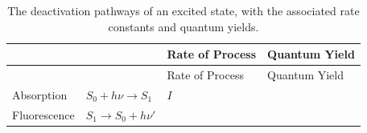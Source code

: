 \documentclass[
]{book}
\begin{document}
\begin{longtable}[]{@{}llll@{}}
\caption{\label{tab:QYtab} The deactivation pathways of an excited state, with the associated rate constants and quantum yields.}\tabularnewline
\toprule
\begin{minipage}[b]{0.33\columnwidth}\raggedright
\strut
\end{minipage} & \begin{minipage}[b]{0.24\columnwidth}\raggedright
\strut
\end{minipage} & \begin{minipage}[b]{0.16\columnwidth}\raggedright
Rate of Process\strut
\end{minipage} & \begin{minipage}[b]{0.16\columnwidth}\raggedright
Quantum Yield\strut
\end{minipage}\tabularnewline
\midrule
\endfirsthead
\toprule
\begin{minipage}[b]{0.33\columnwidth}\raggedright
\strut
\end{minipage} & \begin{minipage}[b]{0.24\columnwidth}\raggedright
\strut
\end{minipage} & \begin{minipage}[b]{0.16\columnwidth}\raggedright
Rate of Process\strut
\end{minipage} & \begin{minipage}[b]{0.16\columnwidth}\raggedright
Quantum Yield\strut
\end{minipage}\tabularnewline
\midrule
\endhead
\begin{minipage}[t]{0.33\columnwidth}\raggedright
Absorption\strut
\end{minipage} & \begin{minipage}[t]{0.24\columnwidth}\raggedright
\(S_0 + h \nu \longrightarrow S_1\)\strut
\end{minipage} & \begin{minipage}[t]{0.16\columnwidth}\raggedright
\(I\)\strut
\end{minipage} & \begin{minipage}[t]{0.16\columnwidth}\raggedright
\strut
\end{minipage}\tabularnewline
\begin{minipage}[t]{0.33\columnwidth}\raggedright
Fluorescence\strut
\end{minipage} & \begin{minipage}[t]{0.24\columnwidth}\raggedright
\(S_1 \longrightarrow S_0 + h \nu'\)\strut
\end{minipage} & \begin{minipage}[t]{0.16\columnwidth}\raggedright

\end{minipage}
\end{longtable}
\end{document}
